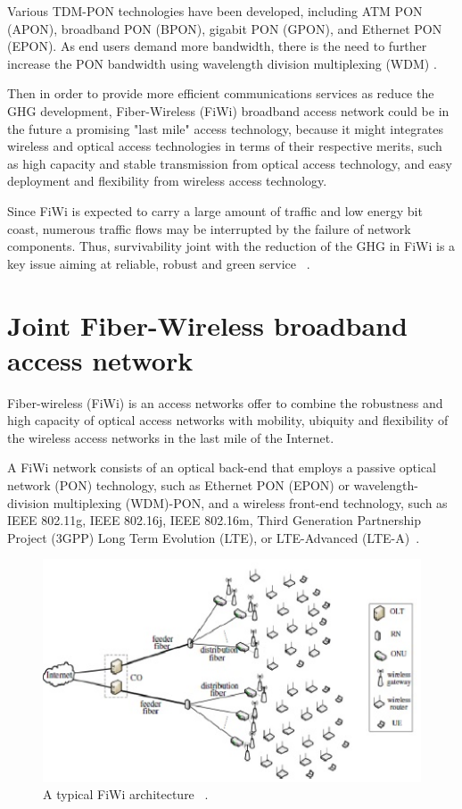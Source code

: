 \documentclass[conference,compsoc]{IEEEtran}
\begin{document}
Various TDM-PON technologies have been developed, including ATM PON (APON), broadband PON (BPON), 
gigabit PON (GPON), and Ethernet PON (EPON). As end users demand more bandwidth, there is the need 
to further increase the PON bandwidth using wavelength division multiplexing (WDM) \cite{5759821}.

Then in order to provide more efficient communications services as reduce the GHG development, Fiber-Wireless (FiWi) broadband access network could be in the future a promising "last mile" access technology, because it might integrates wireless and optical access technologies in terms of their respective merits, such as high capacity and stable transmission from optical access technology, and easy deployment and flexibility from wireless access technology. 

Since FiWi is expected to carry a large amount of traffic and low energy bit coast, numerous traffic flows may be interrupted by the failure of network components. Thus, survivability  joint with the reduction of the GHG in FiWi is a key issue aiming at reliable, robust  and green service ~\cite{Liu201268}.



\section{Joint Fiber-Wireless broadband access network}
\label{section:Joint Fiber-Wireless broadband access network}

Fiber-wireless (FiWi) is an access networks offer to combine the robustness and 
high capacity of optical access networks with mobility, ubiquity and 
flexibility of the wireless access networks in the last mile of the Internet.

A FiWi network consists of an optical back-end that employs a passive optical network 
(PON) technology, such as Ethernet PON (EPON) or wavelength-division multiplexing (WDM)-PON, and a 
wireless front-end technology, such as
IEEE 802.11g, IEEE 802.16j, IEEE 802.16m, Third Generation
Partnership Project (3GPP) Long Term Evolution (LTE), or LTE-Advanced 
(LTE-A)~\cite{4785396}.

\begin{figure}[H]
 	\includegraphics[width=\linewidth]{fiwi.eps}
 	\caption{A typical FiWi architecture ~\cite{Liu201268}.}
 	\label{fig:fiwi_arch}
\end{figure}
\end{document}
